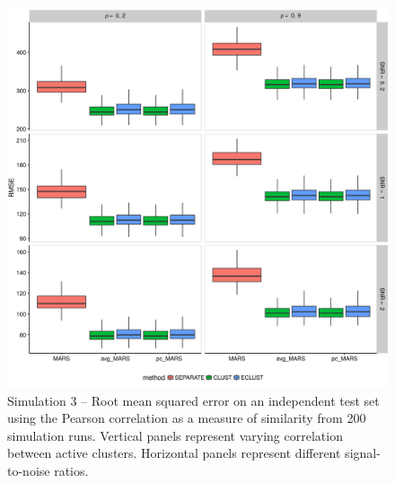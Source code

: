 \begin{figure}[H]
	\centering
	\includegraphics[scale=0.6, keepaspectratio]{./figs/hydra/results/figures/sim3-sept27/RMSE_Correlation_sim3.png}
	\caption{Simulation 3 -- Root mean squared error on an independent test set using the Pearson correlation as a measure of similarity from 200 simulation runs. Vertical panels represent varying correlation between active clusters. Horizontal panels represent different signal-to-noise ratios.}
	\label{fig:RMSE_Correlation_sim3}
\end{figure}

